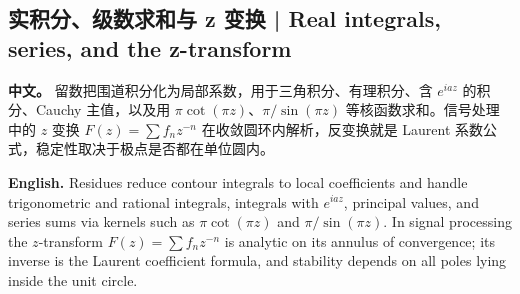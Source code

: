 \documentclass[UTF8,11pt,a4paper]{ctexart}
\newcommand{\APS}[2]{\par\noindent\textbf{中文。} #1\par\noindent\textbf{English.} #2\par\smallskip}
\begin{document}
\subsection*{实积分、级数求和与 z 变换 | Real integrals, series, and the z-transform}
\APS{留数把围道积分化为局部系数，用于三角积分、有理积分、含 $e^{iaz}$ 的积分、Cauchy 主值，以及用 $\pi\cot(\pi z)$、$\pi/\sin(\pi z)$ 等核函数求和。信号处理中的 $z$ 变换 $F(z)=\sum f_nz^{-n}$ 在收敛圆环内解析，反变换就是 Laurent 系数公式，稳定性取决于极点是否都在单位圆内。}{Residues reduce contour integrals to local coefficients and handle trigonometric and rational integrals, integrals with $e^{iaz}$, principal values, and series sums via kernels such as $\pi\cot(\pi z)$ and $\pi/\sin(\pi z)$. In signal processing the $z$-transform $F(z)=\sum f_nz^{-n}$ is analytic on its annulus of convergence; its inverse is the Laurent coefficient formula, and stability depends on all poles lying inside the unit circle.}
\end{document}
